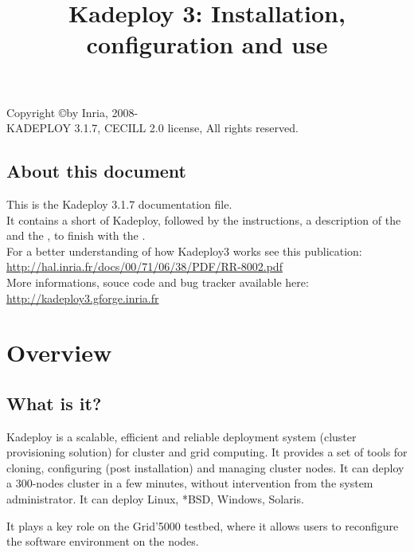 \documentclass[a4wide,10pt,oneside]{book}
\title{Kadeploy 3: Installation, configuration and use}
\newcommand{\version}{3.1.7}
\begin{document}
\setcounter{chapter}{-1}
\maketitle

\vspace*{18cm}
\noindent Copyright \copyright by Inria, 2008-\the\year\\
KADEPLOY \version, CECILL 2.0 license, All rights reserved.

\tableofcontents

\section*{About this document}
This is the Kadeploy \version{} documentation file.
\\

It contains a short  of Kadeploy, followed by the  instructions, a description of the  and the  , to finish with the .
\\

For a better understanding of how Kadeploy3 works see this publication:\\
\url{http://hal.inria.fr/docs/00/71/06/38/PDF/RR-8002.pdf}
\\

More informations, souce code and bug tracker available here:\\
\url{http://kadeploy3.gforge.inria.fr}


\chapter{Overview}\label{chap:Overview}
\section{What is it?}

Kadeploy is a scalable, efficient and reliable deployment system (cluster
provisioning solution) for cluster and grid computing. It provides a set of
tools for cloning, configuring (post installation) and managing cluster
nodes. It can deploy a 300-nodes cluster in a few minutes, without
intervention from the system administrator. It can deploy Linux, *BSD,
Windows, Solaris.

It plays a key role on the Grid'5000 testbed, where it allows users to
reconfigure the software environment on the nodes.
\end{document}
